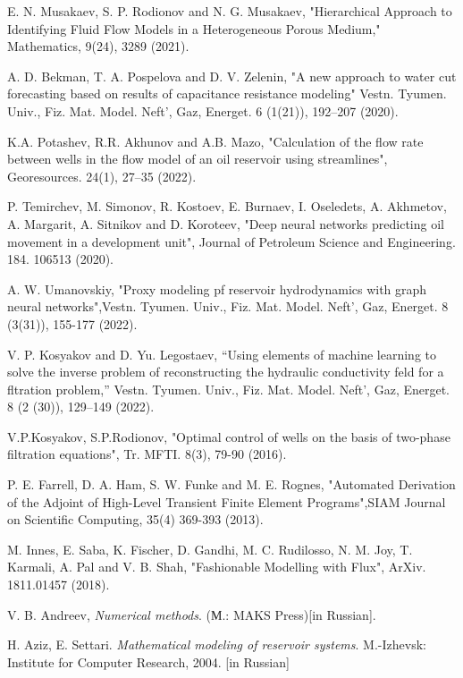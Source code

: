 \documentclass{article}
\begin{document}
\begin{thebibliography}{20}
	
 E. N. Musakaev, S. P. Rodionov and N. G. Musakaev, "Hierarchical Approach to Identifying Fluid Flow Models in a Heterogeneous Porous Medium," Mathematics, 9(24), 3289 (2021).

 A. D. Bekman, T. A. Pospelova and D. V. Zelenin,  "A new approach to water cut forecasting based on results of capacitance resistance modeling" Vestn. Tyumen. Univ., Fiz. Mat. Model. Neft’, Gaz, Energet. 6 (1(21)), 192–207 (2020).

 K.A. Potashev, R.R. Akhunov and  A.B. Mazo, "Calculation of the flow rate between wells in the flow model of an oil reservoir using streamlines", Georesources. 24(1), 27–35 (2022).

  P. Temirchev, M. Simonov, R. Kostoev, E. Burnaev, I. Oseledets, A. Akhmetov, A. Margarit, A. Sitnikov and D. Koroteev, "Deep neural networks predicting oil movement in a development unit", Journal of Petroleum Science and Engineering. 184. 106513 (2020).

 A. W. Umanovskiy, "Proxy modeling pf reservoir hydrodynamics with graph neural networks",Vestn. Tyumen. Univ., Fiz. Mat. Model. Neft’, Gaz, Energet. 8 (3(31)), 155-177 (2022).

 V. P. Kosyakov and D. Yu. Legostaev, “Using elements of machine learning to solve the inverse problem of reconstructing the hydraulic conductivity feld for a fltration problem,” Vestn. Tyumen. Univ., Fiz. Mat. Model. Neft’, Gaz, Energet. 8 (2 (30)), 129–149 (2022).

 V.P.Kosyakov, S.P.Rodionov, "Optimal control of wells on the basis of two-phase filtration equations",  Tr. MFTI. 8(3), 79-90 (2016).

 P. E. Farrell, D. A. Ham, S. W. Funke and M. E. Rognes, "Automated Derivation of the Adjoint of High-Level Transient Finite Element Programs",SIAM Journal on Scientific Computing, 35(4) 369-393 (2013).

  M. Innes, E. Saba, K. Fischer, D. Gandhi, M. C. Rudilosso, N. M. Joy, T. Karmali, A. Pal and V. B. Shah, "Fashionable Modelling with Flux", ArXiv. 1811.01457 (2018).

 V. B. Andreev, \textit{Numerical methods}. (М.: MAKS Press)[in Russian].

 H. Aziz, E. Settari. \textit{Mathematical modeling of reservoir systems}.  M.-Izhevsk: Institute for Computer Research, 2004. [in Russian]


\end{thebibliography}
\end{document}
